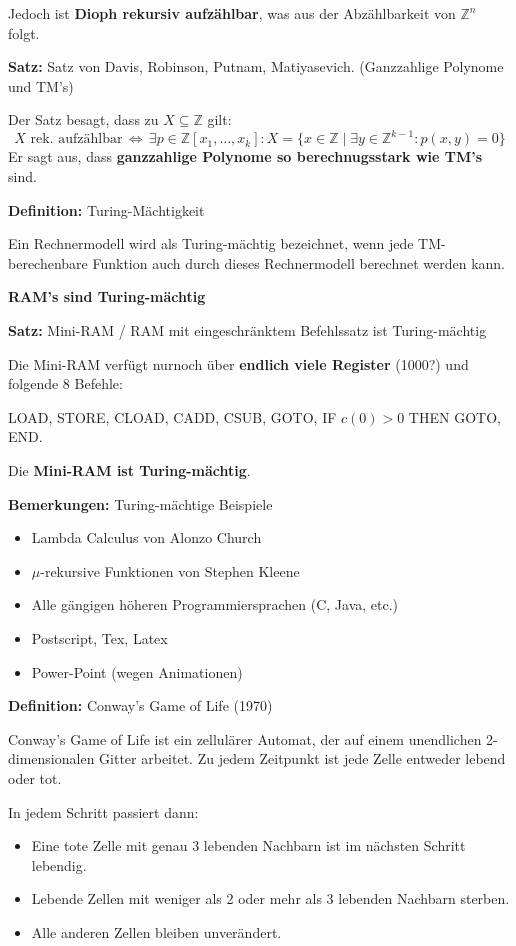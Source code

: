 \documentclass[a4paper,graphics,11pt]{article}
\newcommand{\Iff}[0]{\,\Longleftrightarrow\,}
\begin{document}
Jedoch ist \textbf{Dioph rekursiv aufzählbar}, was aus der Abzählbarkeit von $\mathbb{Z}^n$ folgt.

\newpage

\textbf{Satz:} Satz von Davis, Robinson, Putnam, Matiyasevich. (Ganzzahlige Polynome und TM's)

Der Satz besagt, dass zu $X\subseteq \mathbb{Z}$ gilt:
$$
    X \text{ rek. aufzählbar} \Iff
    \exists p \in \mathbb{Z}[x_1,\dots,x_k] : X = \{x \in \mathbb{Z} \mid \exists y \in \mathbb{Z}^{k-1}: p(x,y) = 0\}
$$
Er sagt aus, dass \textbf{ganzzahlige Polynome so berechnugsstark wie TM's} sind.

\strut

\textbf{Definition:} Turing-Mächtigkeit

Ein Rechnermodell wird als Turing-mächtig bezeichnet, wenn jede TM-berechenbare Funktion
auch durch dieses Rechnermodell berechnet werden kann.

\textbf{RAM's sind Turing-mächtig}

\strut

\textbf{Satz:} Mini-RAM / RAM mit eingeschränktem Befehlssatz ist Turing-mächtig

Die Mini-RAM verfügt nurnoch über \textbf{endlich viele Register} (1000?) und folgende 8 Befehle:

LOAD, STORE, CLOAD, CADD, CSUB, GOTO, IF $c(0) > 0$ THEN GOTO, END.

Die \textbf{Mini-RAM ist Turing-mächtig}.

\textbf{Bemerkungen:} Turing-mächtige Beispiele
\begin{itemize}
    \item Lambda Calculus von Alonzo Church
    \item $\mu$-rekursive Funktionen von Stephen Kleene
    \item Alle gängigen höheren Programmiersprachen (C, Java, etc.)
    \item Postscript, Tex, Latex
    \item Power-Point (wegen Animationen)
\end{itemize}

\strut

\textbf{Definition:} Conway's Game of Life (1970)

Conway's Game of Life ist ein zellulärer Automat, der auf einem unendlichen 2-dimensionalen Gitter
arbeitet. Zu jedem Zeitpunkt ist jede Zelle entweder lebend oder tot.

In jedem Schritt passiert dann:
\begin{itemize}
    \item Eine tote Zelle mit genau 3 lebenden Nachbarn ist im nächsten Schritt lebendig.
    \item Lebende Zellen mit weniger als 2 oder mehr als 3 lebenden Nachbarn sterben.
    \item Alle anderen Zellen bleiben unverändert.
\end{itemize}
\end{document}
